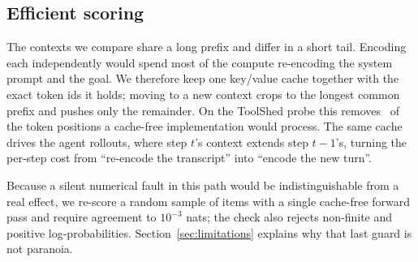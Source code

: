 \subsection{Efficient scoring}

The contexts we compare share a long prefix and differ in a short tail. Encoding
each independently would spend most of the compute re-encoding the system prompt
and the goal. We therefore keep one key/value cache together with the exact
token ids it holds; moving to a new context crops to the longest common prefix
and pushes only the remainder. On the ToolShed probe this removes
\CacheSaving\ of the token positions a cache-free implementation would
process. The same cache drives the agent rollouts, where step $t$'s context
extends step $t{-}1$'s, turning the per-step cost from ``re-encode the
transcript'' into ``encode the new turn''.

Because a silent numerical fault in this path would be indistinguishable from a
real effect, we re-score a random sample of items with a single cache-free
forward pass and require agreement to $10^{-3}$ nats; the check also rejects
non-finite and positive log-probabilities. Section~\ref{sec:limitations} explains
why that last guard is not paranoia.
